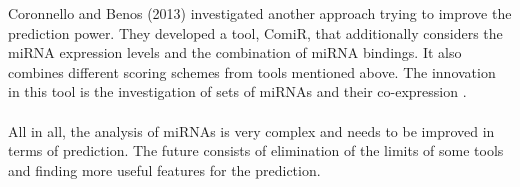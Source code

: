 \documentclass[11pt, a4paper, twoside]{book}
\begin{document}
Coronnello and Benos (2013) investigated another approach trying to improve the prediction power. They developed a tool, ComiR, that additionally considers the miRNA expression levels and the combination of miRNA bindings. It also combines different scoring schemes from tools mentioned above. The innovation in this tool is the investigation of sets of miRNAs and their co-expression \cite{Coronnello}. \\\\

All in all, the analysis of miRNAs is very complex and needs to be improved in terms of prediction. The future consists of elimination of the limits of some tools and finding more useful features for the prediction.






\listoffigures
\listoftables




\end{document}
